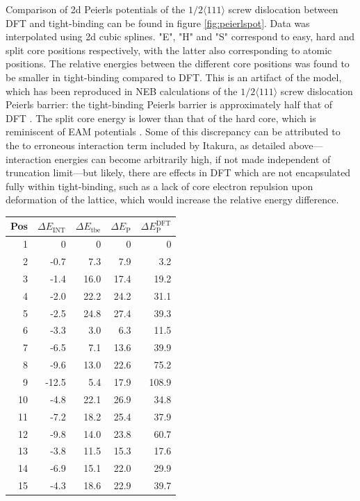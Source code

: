\documentclass[a4paper,11pt]{article}
\begin{document}
Comparison of 2d Peierls potentials of the \(1/2\langle 111 \rangle\) screw dislocation between DFT and
tight-binding can be found in figure \ref{fig:peierlspot}. Data was interpolated using 2d
cubic splines. "E", "H" and "S" correspond to easy, hard and split core positions
respectively, with the latter also corresponding to atomic positions. The relative energies
between the different core positions was found to be smaller in tight-binding compared to
DFT. This is an artifact of the model, which has been reproduced in NEB calculations of the
\(1/2\langle 111\rangle\) screw dislocation Peierls barrier: the tight-binding Peierls barrier is
approximately half that of DFT \cite{Simpson2019}. The split core energy is lower than that of
the hard core, which is reminiscent of EAM potentials \cite{Itakura2012}. Some of this
discrepancy can be attributed to the to erroneous interaction term included by Itakura, as
detailed above---interaction energies can become arbitrarily high, if not made independent
of truncation limit---but likely, there are effects in DFT which are not encapsulated fully
within tight-binding, such as a lack of core electron repulsion upon deformation of the
lattice, which would increase the relative energy difference.

\begin{center}
\begin{tabular}{rrrrr}
Pos & \(\Delta E_{\text{INT}}\) & \(\Delta E_{\text{tbe}}\) & \(\Delta E_{\text{P}}\) & \(\Delta E_{\text{P}}^{\text{DFT}}\)\\
\hline
1 & 0 & 0 & 0 & 0\\
2 & -0.7 & 7.3 & 7.9 & 3.2\\
3 & -1.4 & 16.0 & 17.4 & 19.2\\
4 & -2.0 & 22.2 & 24.2 & 31.1\\
5 & -2.5 & 24.8 & 27.4 & 39.3\\
6 & -3.3 & 3.0 & 6.3 & 11.5\\
7 & -6.5 & 7.1 & 13.6 & 39.9\\
8 & -9.6 & 13.0 & 22.6 & 75.2\\
9 & -12.5 & 5.4 & 17.9 & 108.9\\
10 & -4.8 & 22.1 & 26.9 & 34.8\\
11 & -7.2 & 18.2 & 25.4 & 37.9\\
12 & -9.8 & 14.0 & 23.8 & 60.7\\
13 & -3.8 & 11.5 & 15.3 & 17.6\\
14 & -6.9 & 15.1 & 22.0 & 29.9\\
15 & -4.3 & 18.6 & 22.9 & 39.7\\
\end{tabular}
\end{center}
\end{document}
